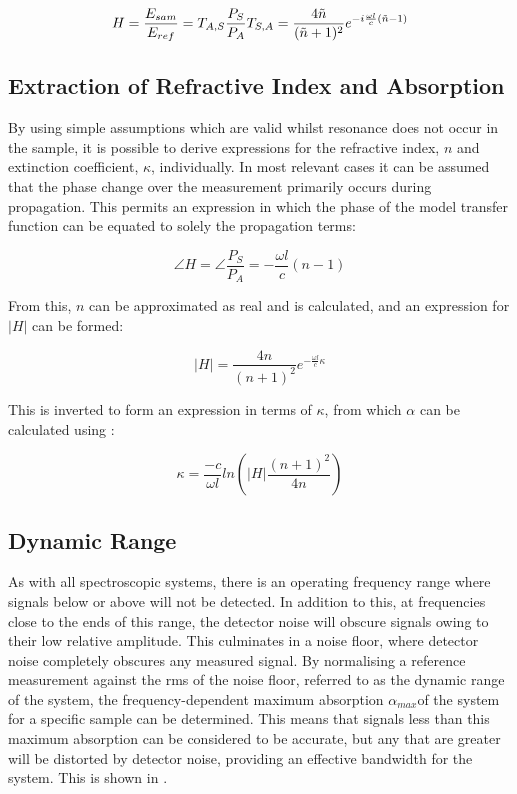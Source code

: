 \begin{equation}
H = \frac{E_{sam}}{E_{ref}} = T_{A,S} \frac{P_S}{P_A} T_{S,A} = \frac{4\Tilde{n}}{(\Tilde{n} + 1)^2} e^{-i\frac{\omega l}{c} (\Tilde{n}-1)}
\end{equation}

\subsection{Extraction of Refractive Index and Absorption}
By using simple assumptions which are valid whilst resonance does not occur in the sample, it is possible to derive expressions for the refractive index, \(n\) and extinction coefficient, \(\kappa\), individually.  In most relevant cases it can be assumed that the phase change over the measurement primarily occurs during propagation. This permits an expression in which the phase of the model transfer function can be equated to solely the propagation terms:

\begin{equation}
\angle H = \angle \frac{P_S}{P_A} = -\frac{\omega l}{c}(n-1)
\end{equation}

From this, \(n\) can be approximated as real and is calculated, and an expression for \(|H|\) can be formed:

\begin{equation}
|H| = \frac{4n}{(n+1)^2}e^{-\frac{\omega l}{c}\kappa}
\end{equation}

This is inverted to form an expression in terms of \(\kappa\), from which \(\alpha\) can be calculated using :

\begin{equation}
\kappa = \frac{-c}{\omega l} ln\left(|H|\frac{(n+1)^2}{4n}\right)
\end{equation}

\subsection{Dynamic Range}
As with all spectroscopic systems, there is an operating frequency range where signals below or above will not be detected. In addition to this, at frequencies close to the ends of this range, the detector noise will obscure signals owing to their low relative amplitude. This culminates in a noise floor, where detector noise completely obscures any measured signal. By normalising a reference measurement against the \acrfull{rms} of the noise floor, referred to as the dynamic range of the system, the frequency\nobreakdash-dependent maximum absorption \DIFdelbegin \DIFdel{, }\DIFdelend \(\alpha_{max}\)\DIFdelbegin \DIFdel{, }\DIFdelend \DIFaddbegin \DIFadd{) }\DIFaddend of the system for a specific sample can be determined. This means that signals less than this maximum absorption can be considered to be accurate, but any that are greater will be distorted by detector noise, providing an effective bandwidth for the system. This is shown in .

